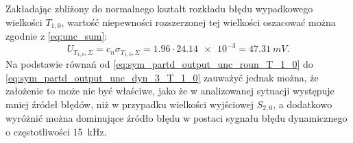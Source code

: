 Zakładając zbliżony do normalnego kształt rozkładu błędu wypadkowego wielkości $T_{1,0}$, wartość niepewności rozszerzonej tej wielkości oszacować można zgodnie z \eqref{eq:unc_sum}:
\begin{equation}
U_{T_{1,0},\Sigma} = c_{n} \sigma_{T_{1,0},\Sigma} = 1.96 \cdot \num{24.14e-3} = \qty{47.31}{mV} \label{eq:sym_partd_output_unc_total_a_T_1_0}.
\end{equation}
Na podstawie równań od \eqref{eq:sym_partd_output_unc_roun_T_1_0} do \eqref{eq:sym_partd_output_unc_dyn_3_T_1_0} zauważyć jednak można, że założenie to może nie być właściwe, jako że w analizowanej sytuacji występuje mniej źródeł błędów, niż w przypadku wielkości wyjściowej $S_{2,0}$, a dodatkowo wyróżnić można dominujące źródło błędu w postaci sygnału błędu dynamicznego o częstotliwości \qty{15}{kHz}.

